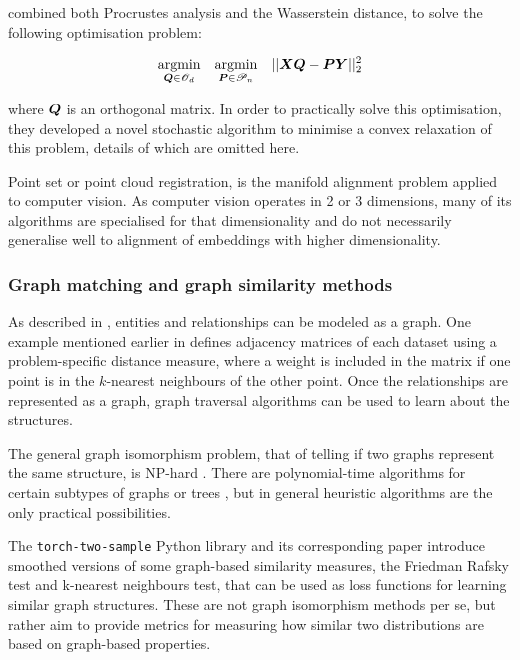 \cite{UnsupervisedAlignmentWP} combined both Procrustes analysis and the Wasserstein distance, to solve the following optimisation problem:

\begin{equation}
\begin{split}
\underset{\boldsymbol{Q} \in \mathscr{O}_d}{\operatorname{argmin}} \quad \underset{\boldsymbol{P} \in \mathscr{P}_n }{\operatorname{argmin}}\quad || \boldsymbol{X} \boldsymbol{Q} - \boldsymbol{P} \boldsymbol{Y}||_2^2
\end{split}
\end{equation}

where $\boldsymbol{Q}$ is an orthogonal matrix. In order to practically solve this optimisation, they developed a novel stochastic algorithm to minimise a convex relaxation of this problem, details of which are omitted here. 

Point set or point cloud registration, is the manifold alignment problem applied to computer vision. As computer vision operates in 2 or 3 dimensions, many of its algorithms are specialised for that dimensionality and do not necessarily generalise well to alignment of embeddings with higher dimensionality. 

\subsubsection{Graph matching and graph similarity methods}

As described in \cite{kalinowski2020survey}, entities and relationships can be modeled as a graph. One example mentioned earlier in  \cite{ManifoldLearningTheoryAndApplications} defines adjacency matrices of each dataset using a problem-specific distance measure, where a weight is included in the matrix if one point is in the $k$-nearest neighbours of the other point. Once the relationships are represented as a graph, graph traversal algorithms can be used to learn about the structures. 

The general graph isomorphism problem, that of telling if two graphs represent the same structure, is NP-hard \cite{GraphIsomorphismNPHard}. There are polynomial-time algorithms for certain subtypes of graphs or trees , but in general heuristic algorithms are the only practical possibilities. 

The \texttt{torch-two-sample} Python library and its corresponding paper \cite{torchtwosample} introduce smoothed versions of some graph-based similarity measures, the Friedman Rafsky test and k-nearest neighbours test, that can be used as loss functions for learning similar graph structures. These are not graph isomorphism methods per se, but rather aim to provide metrics for measuring how similar two distributions are based on graph-based properties.

